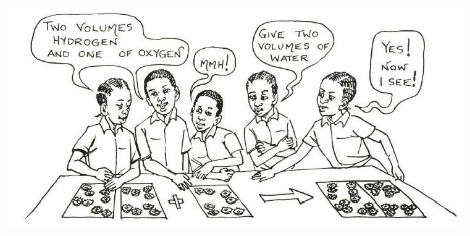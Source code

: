 \begin{center}
\includegraphics[width=0.9\textwidth]{./img/source/avogadro-students.jpg}
\end{center}

\pagebreak